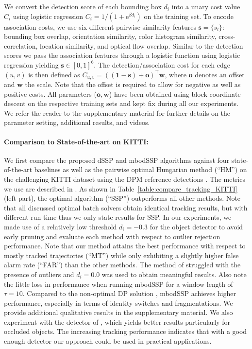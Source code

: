 \documentclass[10pt,twocolumn,letterpaper]{article}
\newcommand{\bs}{\mathbf{s}}
\newcommand{\bw}{\mathbf{w}}
\newcommand{\bo}{\mathbf{o}}
\begin{document}
We convert the detection score of each bounding box $d_i$ into a unary cost value $C_i$ using logistic regression $C_i = 1 / (1 + \mathrm e^{\beta d_i})$ on the training set.
To encode association costs, we use six different pairwise similarity features $\mathbf{s} = \{s_l\}$: bounding box overlap, orientation similarity, color histogram similarity, cross-correlation, location similarity, and optical flow overlap.
Similar to the detection scores we pass the association features through a logistic function using logistic regression yielding $\mathbf{s}\in[0,1]^6$.
The detection/association cost for each edge $(u,v)$ is then defined as $C_{u,v} = ((\mathbf{1}-\bs)+\bo)^\top \bw$, 
where $\bo$ denotes an offset and $\bw$ the scale. Note that the offset is required to allow for negative as well as positive costs.
All parameters ($\bo, \bw$) have been obtained using block coordinate descent on the respective training sets and kept fix during all our experiments. 
We refer the reader to the supplementary material for further details on the parameter setting, additional results, and videos. 

\paragraph{Comparison to State-of-the-art on KITTI:}
We first compare the proposed dSSP and mbodSSP algorithms against four state-of-the-art baselines \cite{Geiger2014PAMI,Pirsiavash2011CVPR,Andriyenko2012CVPR,Milan2014PAMI} as well as the pairwise optimal Hungarian method (``HM'') on the challenging KITTI dataset using the DPM reference detections \cite{Felzenszwalb2010PAMI}. The metrics we use are described in \cite{Li2009CVPRa,Bernardin2008JIVP}. 
As shown in Table~\ref{table:compare_tracking_KITTI} (left part), the optimal algorithm (``SSP'') outperforms all other methods. Note that all discussed optimal batch solvers obtain identical tracking results, but with different run time thus we only state results for SSP. In our experiments, we made use of a relatively low threshold $d_i=-0.3$ for the object detector to avoid early pruning and evaluate each method with respect to outlier rejection performance. Note that our method attains the best performance with respect to mostly tracked trajectories (``MT'') while only exhibiting a slightly higher false alarm rate (``FAR'') than the other methods.
The method of \cite{Andriyenko2012CVPR} struggled with the presence of outliers and $d_i=0.0$ was used to obtain meaningful results. 
Also note the little loss in performance when running mbodSSP for a window length of $\tau=10$.
Compared to the non-optimal DP solution \cite{Pirsiavash2011CVPR}, mbodSSP achieves higher performance, especially in terms of identity switches and fragmentations. We provide additional qualitative results in the supplementary material.
We also experiment with the detector of \cite{Wang2013ICCV}, which yields better results  particularly for occluded objects. The increasing tracking performance indicates that with a good enough detector our approach could be used in practical applications. 
\end{document}
